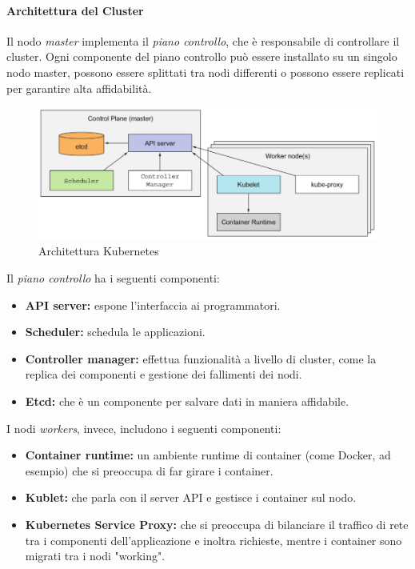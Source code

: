 \documentclass{article}
\begin{document}
\paragraph{Architettura del Cluster}
Il nodo \textit{master} implementa il \textit{piano controllo}, che è responsabile di controllare il cluster. Ogni componente del piano controllo può essere installato su un singolo nodo master, possono essere splittati tra nodi differenti o possono essere replicati per garantire alta affidabilità. %
\begin{figure}[H]
    \centering
    \includegraphics[scale=0.4]{img/architettura kubernetes.png}
    \caption{Architettura Kubernetes}
\end{figure}\noindent
Il \textit{piano controllo} ha i seguenti componenti:
\begin{itemize}
    \item \textbf{API server:} espone l'interfaccia ai programmatori.
    \item \textbf{Scheduler:} schedula le applicazioni.
    \item \textbf{Controller manager:} effettua funzionalità a livello di cluster, come la replica dei componenti e gestione dei fallimenti dei nodi.
    \item \textbf{Etcd:} che è un componente per salvare dati in maniera affidabile.
\end{itemize}
I nodi \textit{workers}, invece, includono i seguenti componenti:
\begin{itemize}
    \item \textbf{Container runtime:} un ambiente runtime di container (come Docker, ad esempio) che si preoccupa di far girare i container.
    \item \textbf{Kublet:} che parla con il server API e gestisce i container sul nodo.
    \item \textbf{Kubernetes Service Proxy:} che si preoccupa di bilanciare il traffico di rete tra i componenti dell'applicazione e inoltra richieste, mentre i container sono migrati tra i nodi "working".
\end{itemize}
\end{document}
